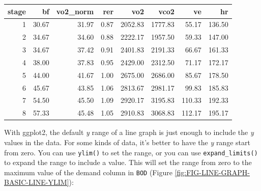 \documentclass[
]{book}
\newenvironment{Shaded}{\begin{snugshade}}{\end{snugshade}}
\newcommand{\AttributeTok}[1]{\textcolor[rgb]{0.77,0.63,0.00}{#1}}
\newcommand{\CommentTok}[1]{\textcolor[rgb]{0.56,0.35,0.01}{\textit{#1}}}
\newcommand{\DecValTok}[1]{\textcolor[rgb]{0.00,0.00,0.81}{#1}}
\newcommand{\FunctionTok}[1]{\textcolor[rgb]{0.00,0.00,0.00}{#1}}
\newcommand{\NormalTok}[1]{#1}
\newcommand{\SpecialCharTok}[1]{\textcolor[rgb]{0.00,0.00,0.00}{#1}}
\begin{document}
\begin{tabular}{r|r|r|r|r|r|r|r}
\hline
stage & bf & vo2\_norm & rer & vo2 & vco2 & ve & hr\\
\hline
1 & 30.67 & 31.97 & 0.87 & 2052.83 & 1777.83 & 55.17 & 136.50\\
\hline
2 & 34.67 & 34.60 & 0.88 & 2222.17 & 1957.50 & 59.33 & 147.00\\
\hline
3 & 34.67 & 37.42 & 0.91 & 2401.83 & 2191.33 & 66.67 & 161.33\\
\hline
4 & 38.00 & 37.83 & 0.95 & 2429.00 & 2312.50 & 71.17 & 172.17\\
\hline
5 & 44.00 & 41.67 & 1.00 & 2675.00 & 2686.00 & 85.67 & 178.50\\
\hline
6 & 45.67 & 43.85 & 1.06 & 2813.67 & 2981.17 & 99.83 & 185.83\\
\hline
7 & 54.50 & 45.50 & 1.09 & 2920.17 & 3195.83 & 110.33 & 192.33\\
\hline
8 & 57.33 & 45.48 & 1.05 & 2910.83 & 3068.83 & 112.17 & 195.17\\
\hline
\end{tabular}

With ggplot2, the default \emph{y} range of a line graph is just enough to include the \emph{y} values in the data. For some kinds of data, it's better to have the \emph{y} range start from zero. You can use \texttt{ylim()} to set the range, or you can use \texttt{expand\_limits()} to expand the range to include a value. This will set the range from zero to the maximum value of the demand column in \texttt{BOD} (Figure \ref{fig:FIG-LINE-GRAPH-BASIC-LINE-YLIM}):

\begin{Shaded}
\end{Shaded}
\end{document}
